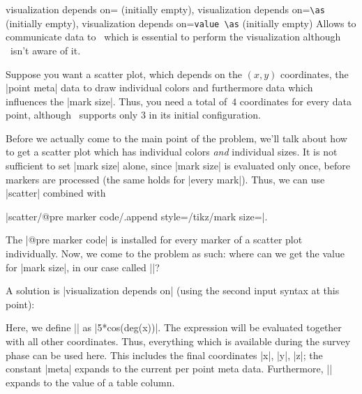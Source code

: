 \begin{pgfplotskeylist}{%
	visualization depends on= (initially empty),%
	visualization depends on=\texttt{\textbackslash as} (initially empty),
	visualization depends on=\texttt{value }\texttt{\textbackslash as} (initially empty)}
	Allows to communicate data to \PGFPlots\ which is essential to perform the visualization although \PGFPlots\ isn't aware of it.

	Suppose you want a scatter plot, which depends on the $(x,y)$ coordinates, the |point meta| data to draw individual colors and furthermore data which influences the |mark size|. Thus, you need a total of~$4$ coordinates for every data point, although \PGFPlots\ supports only $3$ in its initial configuration.
	
	Before we actually come to the main point of the problem, we'll talk about how to get a scatter plot which has individual colors \emph{and} individual sizes. It is not sufficient to set |mark size| alone, since |mark size| is evaluated only once, before markers are processed (the same holds for |every mark|). Thus, we can use |scatter| combined with

	|scatter/@pre marker code/.append style={/tikz/mark size=\perpointmarksize}|.

	\noindent The |@pre marker code| is installed for every marker of a scatter plot individually. Now, we come to the problem as such: where can we get the value for |mark size|, in our case called |\perpointmarksize|?
	
	A solution is |visualization depends on| (using the second input syntax at this point):
\begin{codeexample}[]
\end{codeexample}
	
	Here, we define |\perpointmarksize| as |5*cos(deg(x))|. The expression will be evaluated together with all other coordinates. Thus, everything which is available during the survey phase can be used here. This includes the final coordinates |x|, |y|, |z|; the constant |meta| expands to the current per point meta data. Furthermore, |\thisrow| expands to the value of a table column.


\end{pgfplotskeylist}
